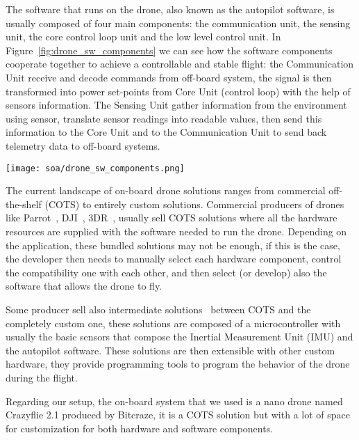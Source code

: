 The software that runs on the drone, also known as the autopilot software, is usually composed of four main components: 
the communication unit, the sensing unit, the core control loop unit and the low level control unit. 
In Figure~\ref{fig:drone_sw_components} we can see how the software components cooperate together to achieve a controllable and stable flight:
the Communication Unit receive and decode commands from off-board system, the signal is then transformed into power set-points 
from Core Unit (control loop) with the help of sensors information. The Sensing Unit gather information from the environment using sensor, translate 
sensor readings into readable values, then send this information to the Core Unit and to the Communication Unit to send back telemetry data to off-board systems.

\begin{SCfigure}[\sidecaptionrelwidth][h]
    \texttt{[image: soa/drone\_sw\_components.png]}
    \caption[Drone software components]{
        The main software components of a drone are: 
        the \textit{Sensing Unit}, the \textit{Communication Unit} and the \textit{Core Unit (control loop)}.
    }\label{fig:drone_sw_components}
\end{SCfigure}

The current landscape of on-board drone solutions ranges from commercial off-the-shelf (COTS) to entirely custom solutions.
Commercial producers of drones like Parrot~\cite{parrot}, DJI~\cite{dij}, 3DR~\cite{3DR}, usually sell COTS solutions where all the hardware resources are supplied
with the software needed to run the drone.
Depending on the application, these bundled solutions may not be enough, if this is the case, 
the developer then needs to manually select each hardware component, control the compatibility one with each other, 
and then select (or develop) also the software that allows the drone to fly.

Some producer sell also intermediate solutions~\cite{pixhawk, px4, cube, navio2} between COTS and the completely custom one, 
these solutions are composed of a microcontroller with usually the basic sensors that compose the 
Inertial Measurement Unit (IMU) and the autopilot software. 
These solutions are then extensible with other custom hardware, they provide programming tools to program the 
behavior of the drone during the flight.

Regarding our setup, the on-board system that we used is a nano drone named Crazyflie 2.1 produced by Bitcraze, it is a COTS solution 
but with a lot of space for customization for both hardware and software components.


